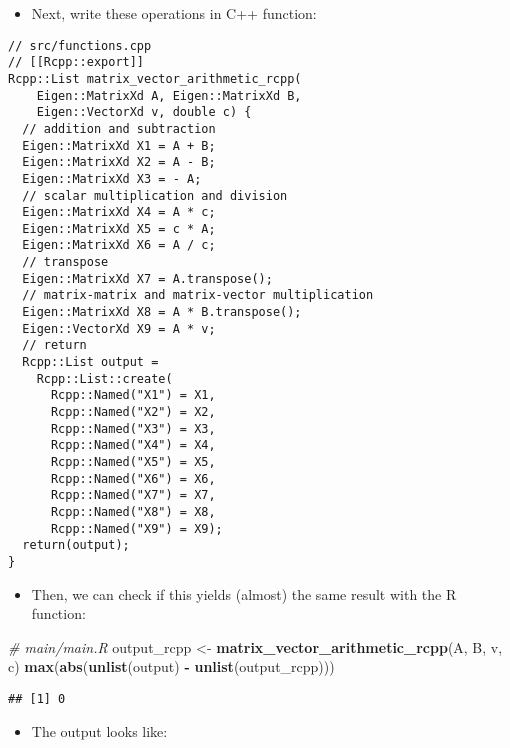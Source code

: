 \documentclass[
]{book}
\newenvironment{Shaded}{\begin{snugshade}}{\end{snugshade}}
\newcommand{\CommentTok}[1]{\textcolor[rgb]{0.56,0.35,0.01}{\textit{#1}}}
\newcommand{\FunctionTok}[1]{\textcolor[rgb]{0.13,0.29,0.53}{\textbf{#1}}}
\newcommand{\NormalTok}[1]{#1}
\newcommand{\OtherTok}[1]{\textcolor[rgb]{0.56,0.35,0.01}{#1}}
\newcommand{\SpecialCharTok}[1]{\textcolor[rgb]{0.81,0.36,0.00}{\textbf{#1}}}
\providecommand{\tightlist}{%
  \setlength{\itemsep}{0pt}\setlength{\parskip}{0pt}}
\begin{document}
\begin{itemize}
\tightlist
\item
  Next, write these operations in C++ function:
\end{itemize}

\begin{verbatim}
// src/functions.cpp
// [[Rcpp::export]]
Rcpp::List matrix_vector_arithmetic_rcpp(
    Eigen::MatrixXd A, Eigen::MatrixXd B, 
    Eigen::VectorXd v, double c) {
  // addition and subtraction
  Eigen::MatrixXd X1 = A + B;
  Eigen::MatrixXd X2 = A - B;
  Eigen::MatrixXd X3 = - A;
  // scalar multiplication and division
  Eigen::MatrixXd X4 = A * c;
  Eigen::MatrixXd X5 = c * A;
  Eigen::MatrixXd X6 = A / c;
  // transpose
  Eigen::MatrixXd X7 = A.transpose();
  // matrix-matrix and matrix-vector multiplication
  Eigen::MatrixXd X8 = A * B.transpose();
  Eigen::VectorXd X9 = A * v;
  // return 
  Rcpp::List output = 
    Rcpp::List::create(
      Rcpp::Named("X1") = X1,
      Rcpp::Named("X2") = X2,
      Rcpp::Named("X3") = X3,
      Rcpp::Named("X4") = X4,
      Rcpp::Named("X5") = X5,
      Rcpp::Named("X6") = X6,
      Rcpp::Named("X7") = X7,
      Rcpp::Named("X8") = X8,
      Rcpp::Named("X9") = X9);
  return(output);
}
\end{verbatim}

\begin{itemize}
\tightlist
\item
  Then, we can check if this yields (almost) the same result with the R function:
\end{itemize}

\begin{Shaded}
\begin{Highlighting}[]
\CommentTok{\# main/main.R}
\NormalTok{output\_rcpp }\OtherTok{\textless{}{-}} \FunctionTok{matrix\_vector\_arithmetic\_rcpp}\NormalTok{(A, B, v, c)}
\FunctionTok{max}\NormalTok{(}\FunctionTok{abs}\NormalTok{(}\FunctionTok{unlist}\NormalTok{(output) }\SpecialCharTok{{-}} \FunctionTok{unlist}\NormalTok{(output\_rcpp)))}
\end{Highlighting}
\end{Shaded}

\begin{verbatim}
## [1] 0
\end{verbatim}

\begin{itemize}
\tightlist
\item
  The output looks like:
\end{itemize}
\end{document}
